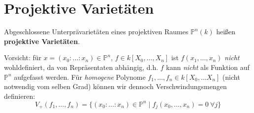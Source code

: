 
\section{Projektive Varietäten}
\label{sec:projektive-varietaeten}
\begin{defn}[orig. 54]
  \label{def:projektive-varietaeten}
  Abgeschlossene Unterprävarietäten eines projektiven Raumes $\mathbb{P}^{n}(k)$
  heißen \textbf{projektive Varietäten}.
\end{defn}
Vorsicht: für $x=(x_{0}:\ldots:x_{n})\in\mathbb{P}^{n}$, $f\in k[X_{0},\ldots,X_{n}]$
ist $f(x_{1},\ldots,x_{n})$ \emph{nicht} wohldefiniert, da von Repräsentaten
abhängig, d.h. $f$ kann \emph{nicht}\textbf{ }als Funktion auf $\mathbb{P}^{n}$
aufgefasst werden. Für \emph{homogene}\textbf{ }Polynome $f_{1},\ldots,f_{n}\in k[X_{0},\ldots X_{n}]$
(nicht notwendig vom selben Grad) können wir dennoch Verschwindungsmengen
definieren:
\[
  V_{+}(f_{1},\ldots,f_{n})=\{(x_{0}:\ldots:x_{n})\in\mathbb{P}^{n}\mid f_{j}(x_{0},\ldots,x_{n})=0\ \forall j\}
\]

